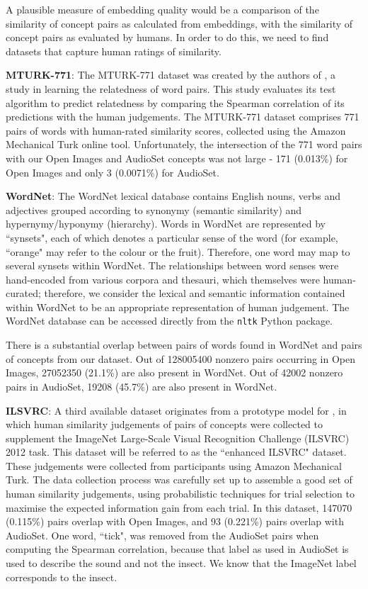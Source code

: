 A plausible measure of embedding quality would be a comparison of the similarity of concept pairs as calculated from embeddings, with the similarity of concept pairs as evaluated by humans. In order to do this, we need to find datasets that capture human ratings of similarity.

\textbf{MTURK-771}: The MTURK-771 dataset was created by the authors of \cite{mturk771}, a study in learning the relatedness of word pairs. This study evaluates its test algorithm to predict relatedness by comparing the Spearman correlation of its predictions with the human judgements. The MTURK-771 dataset comprises 771 pairs of words with human-rated similarity scores, collected using the Amazon Mechanical Turk online tool. Unfortunately, the intersection of the 771 word pairs with our Open Images and AudioSet concepts was not large - 171 (0.013\%)  for Open Images and only 3 (0.0071\%) for AudioSet. 

\textbf{WordNet}: The WordNet \cite{WordNet} lexical database contains English nouns, verbs and adjectives grouped according to synonymy (semantic similarity) and hypernymy/hyponymy (hierarchy). Words in WordNet are represented by ``synsets", each of which denotes a particular sense of the word (for example, ``orange" may refer to the colour or the fruit). Therefore, one word may map to several synsets within WordNet. The relationships between word senses were hand-encoded from various corpora and thesauri, which themselves were human-curated; therefore, we consider the lexical and semantic information contained within WordNet to be an appropriate representation of human judgement. The WordNet database can be accessed directly from the \texttt{nltk} Python package. 

There is a substantial overlap between pairs of words found in WordNet and pairs of concepts from our dataset.  Out of 128005400 nonzero pairs occurring in Open Images, 27052350 (21.1\%) are also present in WordNet. Out of 42002 nonzero pairs in AudioSet, 19208 (45.7\%) are also present in WordNet. 

\textbf{ILSVRC}: A third available dataset originates from a prototype model for \cite{RoadsLoveCVPR}, in which human similarity judgements of pairs of concepts were collected to supplement the ImageNet Large-Scale Visual Recognition Challenge (ILSVRC) 2012 task. This dataset will be referred to as the ``enhanced ILSVRC" dataset. These judgements were collected from participants using Amazon Mechanical Turk. The data collection process was carefully set up to assemble a good set of human similarity judgements, using probabilistic techniques for trial selection to maximise the expected information gain from each trial. In this dataset, 147070 (0.115\%) pairs overlap with Open Images, and 93 (0.221\%) pairs overlap with AudioSet. One word, ``tick", was removed from the AudioSet pairs when computing the Spearman correlation, because that label as used in AudioSet is used to describe the sound and not the insect. We know that the ImageNet label corresponds to the insect. 

